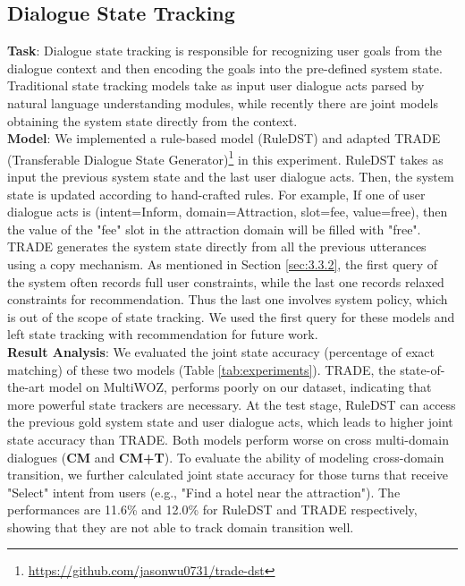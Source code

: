 \subsection{Dialogue State Tracking}
\textbf{Task}:
Dialogue state tracking is responsible for recognizing user goals from the dialogue context and then encoding the goals into the pre-defined system state.
Traditional state tracking models take as input user dialogue acts parsed by natural language understanding modules, while recently there are joint models obtaining the system state directly from the context.\\

\noindent\textbf{Model}:
We implemented a rule-based model (RuleDST) and adapted TRADE (Transferable Dialogue State Generator)\footnote{\url{https://github.com/jasonwu0731/trade-dst}} \cite{TRADE} in this experiment. RuleDST takes as input the previous system state and the last user dialogue acts. Then, the system state is updated according to hand-crafted rules. 
For example, If one of user dialogue acts is (intent=Inform, domain=Attraction, slot=fee, value=free), then the value of the "fee" slot in the attraction domain will be filled with "free". 
TRADE generates the system state directly from all the previous utterances using a copy mechanism. 
As mentioned in Section \ref{sec:3.3.2}, the first query of the system often records full user constraints, while the last one records relaxed constraints for recommendation. Thus the last one involves system policy, which is out of the scope of state tracking. We used the first query for these models and left state tracking with recommendation for future work.\\

\noindent\textbf{Result Analysis}:
We evaluated the joint state accuracy (percentage of exact matching) of these two models (Table \ref{tab:experiments}).
TRADE, the state-of-the-art model on MultiWOZ, performs poorly on our dataset, indicating that more powerful state trackers are necessary.
At the test stage, RuleDST can access the previous gold system state and user dialogue acts, which leads to higher joint state accuracy than TRADE. 
Both models perform worse on cross multi-domain dialogues (\textbf{CM} and \textbf{CM+T}).
To evaluate the ability of modeling cross-domain transition, we further calculated joint state accuracy for those turns that receive "Select" intent from users (e.g., "Find a hotel near the attraction").
The performances are 11.6\% and 12.0\% for RuleDST and TRADE respectively, showing that they are not able to track domain transition well.

